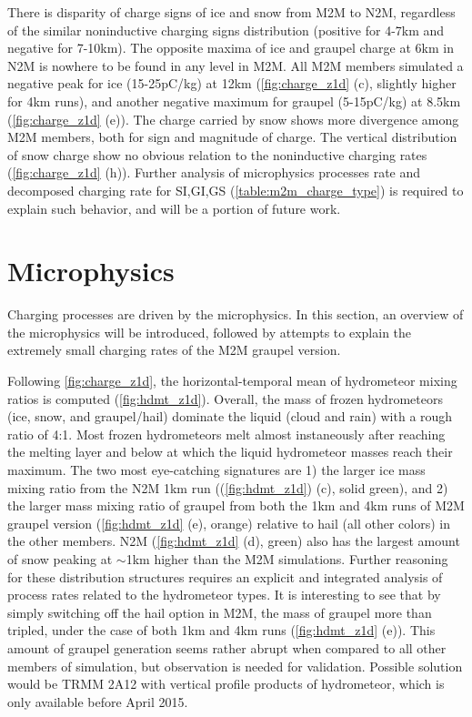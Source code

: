 There is disparity of charge signs of ice and snow from M2M to N2M, regardless of the similar noninductive charging signs distribution (positive for 4-7km and negative for 7-10km). The opposite maxima of ice and graupel charge at 6km in N2M is nowhere to be found in any level in M2M. All M2M members simulated a negative peak for ice (15-25pC/kg) at 12km (\ref{fig:charge_z1d} (c), slightly higher for 4km runs), and another negative maximum for graupel (5-15pC/kg) at 8.5km (\ref{fig:charge_z1d} (e)). The charge carried by snow shows more divergence among M2M members, both for sign and magnitude of charge. The vertical distribution of snow charge show no obvious relation to the noninductive charging rates (\ref{fig:charge_z1d} (h)). Further analysis of microphysics processes rate and decomposed charging rate for SI,GI,GS (\ref{table:m2m_charge_type}) is required to explain such behavior, and will be a portion of future work.

\section{Microphysics}
\label{sec:micro_anal}
Charging processes are driven by the microphysics. In this section, an overview of the microphysics will be introduced, followed by attempts to explain the extremely small charging rates of the M2M graupel version.

Following \ref{fig:charge_z1d}, the horizontal-temporal mean of hydrometeor mixing ratios is computed (\ref{fig:hdmt_z1d}). Overall, the mass of frozen hydrometeors (ice, snow, and graupel/hail) dominate the liquid (cloud and rain) with a rough ratio of 4:1. Most frozen hydrometeors melt almost instaneously after reaching the melting layer and below at which the liquid hydrometeor masses reach their maximum. The two most eye-catching signatures are 1) the larger ice mass mixing ratio from the N2M 1km run ((\ref{fig:hdmt_z1d}) (c), solid green), and 2) the larger mass mixing ratio of graupel from both the 1km and 4km runs of M2M graupel version (\ref{fig:hdmt_z1d} (e), orange) relative to hail (all other colors) in the other members. N2M (\ref{fig:hdmt_z1d} (d), green) also has the largest amount of snow peaking at $\sim$1km higher than the M2M simulations. Further reasoning for these distribution structures requires an explicit and integrated analysis of process rates related to the hydrometeor types. It is interesting to see that by simply switching off the hail option in M2M, the mass of graupel more than tripled, under the case of both 1km and 4km runs (\ref{fig:hdmt_z1d} (e)). This amount of graupel generation seems rather abrupt when compared to all other members of simulation, but observation is needed for validation. Possible solution would be TRMM 2A12 with vertical profile products of hydrometeor, which is only available before April 2015. 

